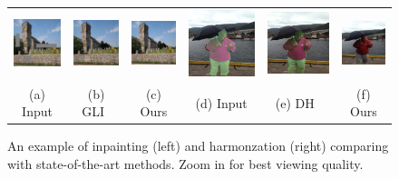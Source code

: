 \begin{figure}[t]
\centering
\setlength\tabcolsep{1pt}
\begin{tabular}{cccccc}
  \includegraphics[width=.16\textwidth]{figures/teaser/000000120572_input_image.jpg}&
  \includegraphics[width=.16\textwidth]{figures/teaser/output_mask17.jpg}&
  \includegraphics[width=.16\textwidth]{figures/teaser/000000120572_synthesized_image.jpg} &
    \includegraphics[width=.16\textwidth]{figures/teaser/input.jpg}&
  \includegraphics[width=.16\textwidth]{figures/teaser/dh.jpg}&
  \includegraphics[width=.16\textwidth]{figures/teaser/ours.jpg} \\
  (a) Input  & (b) GLI~\cite{iizuka2017globally} & (c) Ours & (d) Input  & (e) DH~\cite{tsai2017deep} & (f) Ours  \\
\end{tabular}
\caption{An example of inpainting (left) and harmonzation (right) comparing with state-of-the-art methods. Zoom in for best viewing quality.}
\label{fig:teaser}
\vspace{-15pt}
\end{figure}

